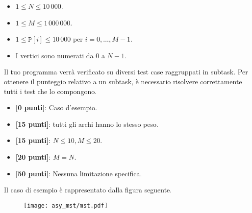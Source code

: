

\Constraints

\begin{itemize}[nolistsep, itemsep=2mm]
	\item $1 \le N \le 10\,000$.
	\item $1 \le M \le 1\,000\,000$.
	\item $1 \le \texttt{P}[i] \le 10\,000$ per $i = 0, \ldots, M-1$.
	\item I vertici sono numerati da $0$ a $N-1$.
\end{itemize}


\Scoring

Il tuo programma verrà verificato su diversi test case raggruppati in subtask. Per ottenere il punteggio relativo a un subtask, è necessario risolvere correttamente tutti i test che lo compongono.

\begin{itemize}[nolistsep,itemsep=2mm]
  \item \textbf{ [\phantom{1}0 punti]}: Caso d'esempio.
  \item \textbf{ [15 punti]}: tutti gli archi hanno lo stesso peso.
  \item \textbf{ [15 punti]}: $N\leq 10, M\leq 20$.
  \item \textbf{ [20 punti]}: $M=N$.
  \item \textbf{ [50 punti]}: Nessuna limitazione specifica.
\end{itemize}



\Examples

\begin{example}
%
\end{example}



\Explanation

Il caso di esempio è rappresentato dalla figura seguente.
\begin{figure}[ht]
	\centering
	\texttt{[image: asy\_mst/mst.pdf]}
\end{figure}


